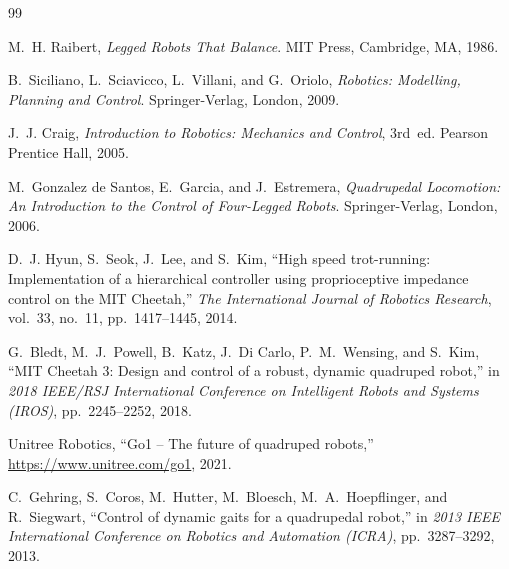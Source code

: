 \documentclass[13pt,a4paper,oneside]{extbook}
\begin{document}
\tableofcontents
\listoftables
\listoffigures


\mainmatter

\fancyhead{}  %
\renewcommand{\footrulewidth}{0.4pt}

\pagestyle{fancy}  %
%







\begin{thebibliography}{99}

M.~H. Raibert,
\textit{Legged Robots That Balance}.
MIT Press, Cambridge, MA, 1986.

B.~Siciliano, L.~Sciavicco, L.~Villani, and G.~Oriolo,
\textit{Robotics: Modelling, Planning and Control}.
Springer-Verlag, London, 2009.

J.~J. Craig,
\textit{Introduction to Robotics: Mechanics and Control}, 3rd~ed.
Pearson Prentice Hall, 2005.

M.~Gonzalez de Santos, E.~Garcia, and J.~Estremera,
\textit{Quadrupedal Locomotion: An Introduction to the Control of Four-Legged Robots}.
Springer-Verlag, London, 2006.

D.~J. Hyun, S.~Seok, J.~Lee, and S.~Kim,
``High speed trot-running: Implementation of a hierarchical controller using proprioceptive impedance control on the MIT Cheetah,''
\textit{The International Journal of Robotics Research}, vol.~33, no.~11, pp.~1417--1445, 2014.

G.~Bledt, M.~J.~Powell, B.~Katz, J.~Di Carlo, P.~M.~Wensing, and S.~Kim,
``MIT Cheetah 3: Design and control of a robust, dynamic quadruped robot,''
in \textit{2018 IEEE/RSJ International Conference on Intelligent Robots and Systems (IROS)}, pp.~2245--2252, 2018.

Unitree Robotics,
``Go1 -- The future of quadruped robots,''
\url{https://www.unitree.com/go1}, 2021.

C.~Gehring, S.~Coros, M.~Hutter, M.~Bloesch, M.~A.~Hoepflinger, and R.~Siegwart,
``Control of dynamic gaits for a quadrupedal robot,''
in \textit{2013 IEEE International Conference on Robotics and Automation (ICRA)}, pp.~3287--3292, 2013.


\end{thebibliography}
\end{document}
